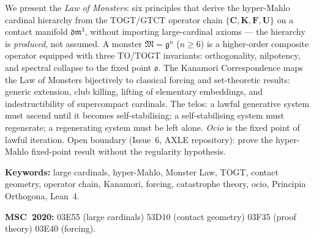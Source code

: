 \documentclass[12pt,a4paper]{amsart}
\theoremstyle{definition}
\theoremstyle{remark}
\newcommand{\Cop}{\mathbf{C}}
\newcommand{\Kop}{\mathbf{K}}
\newcommand{\Fop}{\mathbf{F}}
\newcommand{\Uop}{\mathbf{U}}
\newcommand{\GG}{\mathfrak{g}}
\newcommand{\MM}{\mathfrak{M}}
\newcommand{\dm}{\mathfrak{dm}^3}
\newcommand{\ocio}{\mathfrak{o}}
\begin{document}
\medskip

\begin{tcolorbox}[abstractEN]
We present the \emph{Law of Monsters}: six principles that derive the hyper-Mahlo
cardinal hierarchy from the TOGT/GTCT operator chain
$\{\Cop,\Kop,\Fop,\Uop\}$ on a contact manifold $\dm$, without importing
large-cardinal axioms --- the hierarchy is \emph{produced}, not assumed.
A monster $\MM = \GG^n$ ($n \geq 6$) is a higher-order composite operator equipped
with three TO/TOGT invariants: orthogonality, nilpotency, and spectral collapse to
the fixed point $\ocio$.
The Kanamori Correspondence maps the Law of Monsters bijectively to classical
forcing and set-theoretic results: generic extension, club killing, lifting of
elementary embeddings, and indestructibility of supercompact cardinals.
The telos: a lawful generative system must ascend until it becomes self-stabilising;
a self-stabilising system must regenerate; a regenerating system must be left alone.
\emph{Ocio} is the fixed point of lawful iteration.
Open boundary (Issue~6, AXLE repository): prove the hyper-Mahlo fixed-point result
without the regularity hypothesis.

\medskip
\textbf{Keywords:} large cardinals, hyper-Mahlo, Monster Law, TOGT, contact geometry,
operator chain, Kanamori, forcing, catastrophe theory, ocio, Principia Orthogona, Lean~4.

\smallskip
\textbf{MSC~2020:} 03E55 (large cardinals) \textperiodcentered{} 53D10 (contact geometry) \textperiodcentered{}
03F35 (proof theory) \textperiodcentered{} 03E40 (forcing).
\end{tcolorbox}


\end{document}
